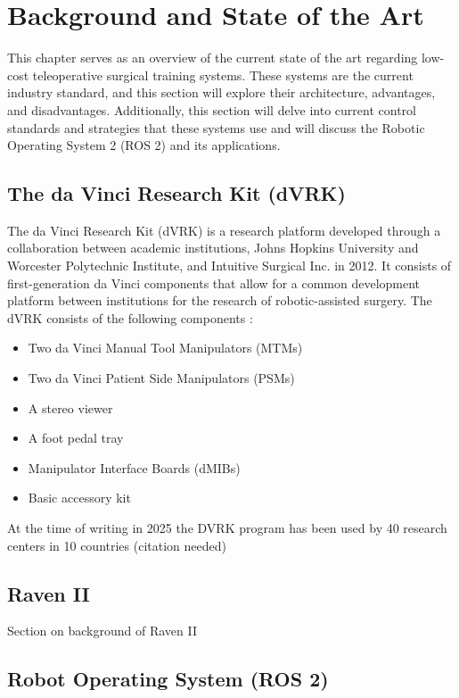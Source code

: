 \chapter{Background and State of the Art}
This chapter serves as an overview of the current state of the art regarding low-cost teleoperative surgical training systems. These systems are the current industry standard, and this section will explore their architecture, advantages, and disadvantages. Additionally, this section will delve into current control standards and strategies that these systems use and will discuss the Robotic Operating System 2 (ROS 2) and its applications.

\section{The da Vinci Research Kit (dVRK)}  
The da Vinci Research Kit (dVRK) is a research platform developed through a collaboration between academic institutions, Johns Hopkins University and Worcester Polytechnic Institute, and Intuitive Surgical Inc. in 2012. It consists of first-generation da Vinci components that allow for a common development platform between institutions for the research of robotic-assisted surgery. The dVRK consists of the following components \cite{dVRK}:  

\begin{itemize}  
    \item Two da Vinci Manual Tool Manipulators (MTMs)  
    \item Two da Vinci Patient Side Manipulators (PSMs)  
    \item A stereo viewer  
    \item A foot pedal tray  
    \item Manipulator Interface Boards (dMIBs)  
    \item Basic accessory kit  
\end{itemize}  

At the time of writing in 2025 the DVRK program has been used by 40 research centers in 10 countries (citation needed)



\section{Raven II}

Section on background of Raven II

\section{Robot Operating System (ROS 2)}

